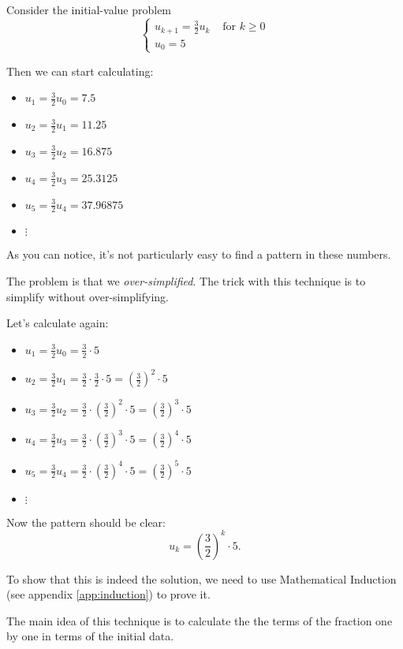 \begin{example}
Consider the initial-value problem
$$
\begin{cases}
u_{k+1} = \frac32 u_k & \text{ for } k \geq 0 \\
u_0 = 5	
\end{cases}
$$

Then we can start calculating:
\begin{itemize}
	\item $u_1 = \frac32 u_0 = 7.5$
	\item $u_2 = \frac32 u_1 = 11.25$
	\item $u_3 = \frac32 u_2 = 16.875$
	\item $u_4 = \frac32 u_3 = 25.3125$
	\item $u_5 = \frac32 u_4 = 37.96875$
	\item $\vdots$
\end{itemize}

As you can notice, it's not particularly easy to find a pattern in these numbers. 

The problem is that we \emph{over-simplified}. The trick with this technique is to simplify without over-simplifying.

Let's calculate again:
\begin{itemize}
	\item $u_1 = \frac32 u_0 = \frac32 \cdot 5$
	\item $u_2 = \frac32 u_1 = \frac32 \cdot \frac32 \cdot 5 = \left(\frac32\right)^2 \cdot 5$
	\item $u_3 = \frac32 u_2 = \frac32 \cdot \left(\frac32\right)^2 \cdot 5 = \left(\frac32\right)^3 \cdot 5$
	\item $u_4 = \frac32 u_3 = \frac32 \cdot \left(\frac32\right)^3 \cdot 5 = \left(\frac32\right)^4 \cdot 5$
	\item $u_5 = \frac32 u_4 = \frac32 \cdot \left(\frac32\right)^4 \cdot 5 = \left(\frac32\right)^5 \cdot 5$
	\item $\vdots$
\end{itemize}

Now the pattern should be clear:
$$
u_k = \left(\frac32\right)^k \cdot 5.
$$

To show that this is indeed the solution, we need to use Mathematical Induction (see appendix \ref{app:induction}) to prove it. 
\end{example}

The main idea of this technique is to calculate the the terms of the fraction one by one in terms of the initial data.

